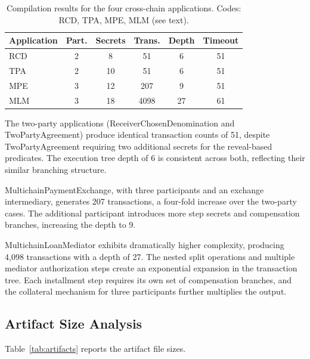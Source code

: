 \documentclass[journal]{IEEEtran}
\begin{document}
\begin{table}[t]
\caption{Compilation results for the four cross-chain applications. Codes: RCD, TPA, MPE, MLM (see text).}
\label{tab:results}
\centering
\footnotesize
\setlength{\tabcolsep}{4pt}
\begin{tabular}{lccccc}
\toprule
Application & Part. & Secrets & Trans. & Depth & Timeout \\
\midrule
RCD & 2 & 8 & 51 & 6 & 51 \\
TPA & 2 & 10 & 51 & 6 & 51 \\
MPE & 3 & 12 & 207 & 9 & 51 \\
MLM & 3 & 18 & 4098 & 27 & 61 \\
\bottomrule
\end{tabular}
\end{table}

The two-party applications (ReceiverChosenDenomination and TwoPartyAgreement) produce identical transaction counts of 51, despite TwoPartyAgreement requiring two additional secrets for the reveal-based predicates. The execution tree depth of 6 is consistent across both, reflecting their similar branching structure.

MultichainPaymentExchange, with three participants and an exchange intermediary, generates 207 transactions, a four-fold increase over the two-party cases. The additional participant introduces more step secrets and compensation branches, increasing the depth to 9.

MultichainLoanMediator exhibits dramatically higher complexity, producing 4,098 transactions with a depth of 27. The nested split operations and multiple mediator authorization steps create an exponential expansion in the transaction tree. Each installment step requires its own set of compensation branches, and the collateral mechanism for three participants further multiplies the output.

\subsection{Artifact Size Analysis}

Table~\ref{tab:artifacts} reports the artifact file sizes.
\end{document}
